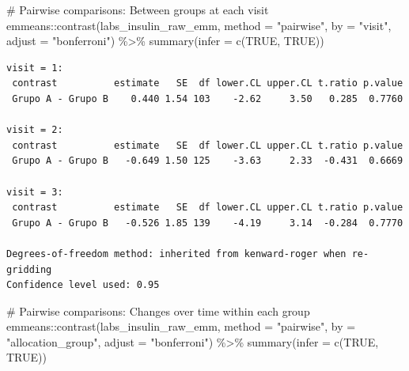 \documentclass[
  letterpaper,
  DIV=11,
  numbers=noendperiod]{scrartcl}
\newenvironment{Shaded}{\begin{snugshade}}{\end{snugshade}}
\newcommand{\AttributeTok}[1]{\textcolor[rgb]{0.40,0.45,0.13}{#1}}
\newcommand{\CommentTok}[1]{\textcolor[rgb]{0.37,0.37,0.37}{#1}}
\newcommand{\ConstantTok}[1]{\textcolor[rgb]{0.56,0.35,0.01}{#1}}
\newcommand{\FunctionTok}[1]{\textcolor[rgb]{0.28,0.35,0.67}{#1}}
\newcommand{\NormalTok}[1]{\textcolor[rgb]{0.00,0.23,0.31}{#1}}
\newcommand{\SpecialCharTok}[1]{\textcolor[rgb]{0.37,0.37,0.37}{#1}}
\newcommand{\StringTok}[1]{\textcolor[rgb]{0.13,0.47,0.30}{#1}}
\begin{document}
\begin{Shaded}
\begin{Highlighting}[]
\CommentTok{\# Pairwise comparisons: Between groups at each visit}
\NormalTok{emmeans}\SpecialCharTok{::}\FunctionTok{contrast}\NormalTok{(labs\_insulin\_raw\_emm, }\AttributeTok{method =} \StringTok{"pairwise"}\NormalTok{, }\AttributeTok{by =} \StringTok{"visit"}\NormalTok{, }\AttributeTok{adjust =} \StringTok{"bonferroni"}\NormalTok{) }\SpecialCharTok{\%\textgreater{}\%} \FunctionTok{summary}\NormalTok{(}\AttributeTok{infer =} \FunctionTok{c}\NormalTok{(}\ConstantTok{TRUE}\NormalTok{, }\ConstantTok{TRUE}\NormalTok{))}
\end{Highlighting}
\end{Shaded}

\begin{verbatim}
visit = 1:
 contrast          estimate   SE  df lower.CL upper.CL t.ratio p.value
 Grupo A - Grupo B    0.440 1.54 103    -2.62     3.50   0.285  0.7760

visit = 2:
 contrast          estimate   SE  df lower.CL upper.CL t.ratio p.value
 Grupo A - Grupo B   -0.649 1.50 125    -3.63     2.33  -0.431  0.6669

visit = 3:
 contrast          estimate   SE  df lower.CL upper.CL t.ratio p.value
 Grupo A - Grupo B   -0.526 1.85 139    -4.19     3.14  -0.284  0.7770

Degrees-of-freedom method: inherited from kenward-roger when re-gridding 
Confidence level used: 0.95 
\end{verbatim}

\begin{Shaded}
\begin{Highlighting}[]
\CommentTok{\# Pairwise comparisons: Changes over time within each group}
\NormalTok{emmeans}\SpecialCharTok{::}\FunctionTok{contrast}\NormalTok{(labs\_insulin\_raw\_emm, }\AttributeTok{method =} \StringTok{"pairwise"}\NormalTok{, }\AttributeTok{by =} \StringTok{"allocation\_group"}\NormalTok{, }\AttributeTok{adjust =} \StringTok{"bonferroni"}\NormalTok{) }\SpecialCharTok{\%\textgreater{}\%} \FunctionTok{summary}\NormalTok{(}\AttributeTok{infer =} \FunctionTok{c}\NormalTok{(}\ConstantTok{TRUE}\NormalTok{, }\ConstantTok{TRUE}\NormalTok{))}
\end{Highlighting}
\end{Shaded}
\end{document}
